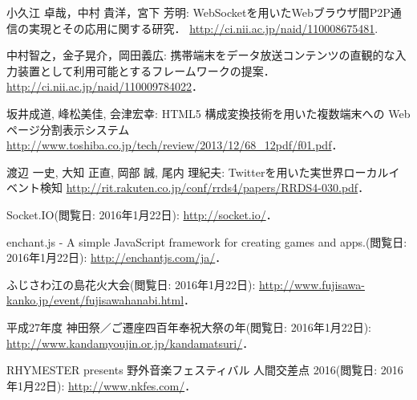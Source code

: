 \begin{thebibliography}{1}
        小久江 卓哉，中村 貴洋，宮下 芳明:
        WebSocketを用いたWebブラウザ間P2P通信の実現とその応用に関する研究．
        \url{http://ci.nii.ac.jp/naid/110008675481}.

        中村智之，金子晃介，岡田義広:
        携帯端末をデータ放送コンテンツの直観的な入力装置として利用可能とするフレームワークの提案．
        \url{http://ci.nii.ac.jp/naid/110009784022}．

        坂井成道, 峰松美佳, 会津宏幸:
        HTML5 構成変換技術を用いた複数端末への Web ページ分割表示システム
        \url{http://www.toshiba.co.jp/tech/review/2013/12/68_12pdf/f01.pdf}．

        渡辺 一史, 大知 正直, 岡部 誠, 尾内 理紀夫:
        Twitterを用いた実世界ローカルイベント検知
        \url{http://rit.rakuten.co.jp/conf/rrds4/papers/RRDS4-030.pdf}．

        Socket.IO(閲覧日: 2016年1月22日):
        \url{http://socket.io/}．

        enchant.js - A simple JavaScript framework for creating games and apps.(閲覧日: 2016年1月22日):
        \url{http://enchantjs.com/ja/}．

        ふじさわ江の島花火大会(閲覧日: 2016年1月22日):
        \url{http://www.fujisawa-kanko.jp/event/fujisawahanabi.html}．

        平成27年度 神田祭／ご遷座四百年奉祝大祭の年(閲覧日: 2016年1月22日):
        \url{http://www.kandamyoujin.or.jp/kandamatsuri/}．

        RHYMESTER presents 野外音楽フェスティバル 人間交差点 2016(閲覧日: 2016年1月22日):
        \url{http://www.nkfes.com/}．

\end{thebibliography}

